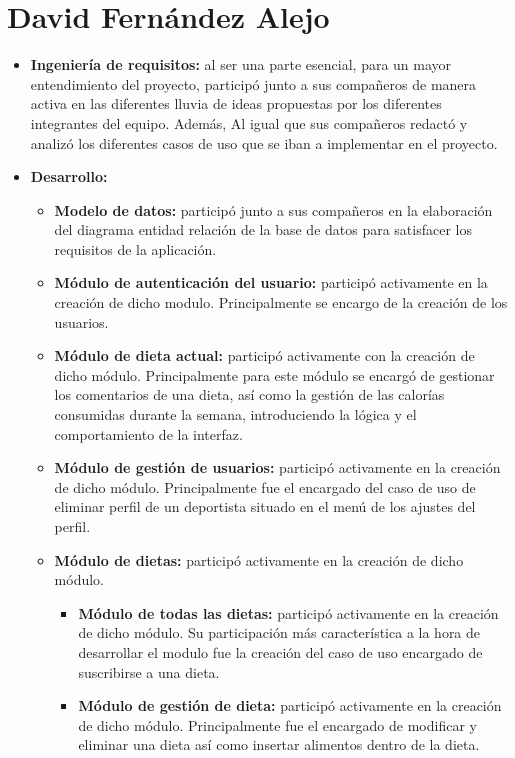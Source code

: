 \section{David Fernández Alejo}
\begin{itemize}
    \item \textbf{Ingeniería de requisitos:} al ser una parte esencial, para un mayor entendimiento del proyecto, participó junto a sus compañeros de manera activa en las diferentes lluvia de ideas propuestas por los diferentes integrantes del equipo. Además, Al igual que sus compañeros redactó y analizó los diferentes casos de uso que se iban a implementar en el proyecto.
    \item \textbf{Desarrollo:}
        \begin{itemize}
            \item \textbf{Modelo de datos:} participó junto a sus compañeros en la elaboración del diagrama entidad relación de la base de datos para satisfacer los requisitos de la aplicación.
            \item \textbf{Módulo de autenticación del usuario:} participó activamente en la creación de dicho modulo. Principalmente se encargo de la creación de los usuarios.
            \item \textbf{Módulo de dieta actual:} participó activamente con la creación de dicho módulo. Principalmente para este módulo se encargó de gestionar los comentarios de una dieta, así como la gestión de las calorías consumidas durante la semana, introduciendo la lógica y el comportamiento de la interfaz.
            \item \textbf{Módulo de gestión de usuarios:} participó activamente en la creación de dicho módulo. Principalmente fue el encargado del caso de uso de eliminar perfil de un deportista situado en el menú de los ajustes del perfil.
            \item \textbf{Módulo de dietas:} participó activamente en la creación de dicho módulo.
            \begin{itemize}
                \item \textbf{Módulo de todas las dietas:} participó activamente en la creación de dicho módulo. Su participación más característica a la hora de desarrollar el modulo fue la creación del caso de uso encargado de suscribirse a una dieta.
                \item \textbf{Módulo de gestión de dieta:} participó activamente en la creación de dicho módulo. Principalmente fue el encargado de modificar y eliminar una dieta así como insertar alimentos dentro de la dieta.

\end{itemize}
\end{itemize}
\end{itemize}
